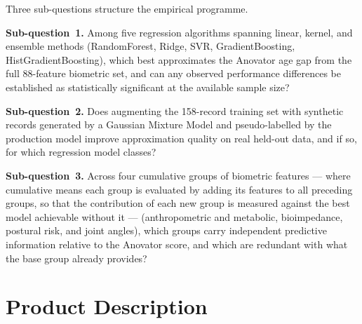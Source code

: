 \documentclass[11pt,a4paper]{report}
\begin{document}
Three sub-questions structure the empirical programme.

\textbf{Sub-question~1.} Among five regression algorithms spanning linear, kernel, and ensemble
methods (RandomForest, Ridge, SVR, GradientBoosting, HistGradientBoosting), which best
approximates the Anovator age gap from the full 88-feature biometric set, and can any observed
performance differences be established as statistically significant at the available sample size?

\textbf{Sub-question~2.} Does augmenting the 158-record training set with synthetic records
generated by a Gaussian Mixture Model and pseudo-labelled by the production model improve
approximation quality on real held-out data, and if so, for which regression model classes?

\textbf{Sub-question~3.} Across four cumulative groups of biometric features --- where cumulative
means each group is evaluated by adding its features to all preceding groups, so that the
contribution of each new group is measured against the best model achievable without it ---
(anthropometric and metabolic, bioimpedance, postural risk, and joint angles), which groups carry
independent predictive information relative to the Anovator score, and which are redundant with
what the base group already provides?

\section{Product Description}
\end{document}
